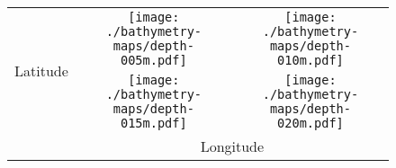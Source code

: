 \documentclass[border=20pt,varwidth=30cm]{standalone}
\begin{document}
\begin{figure}
    \centering
    \begin{tabular}{@{}ccc@{}}
        \multirow{2}{*}[16em]{\begin{rotate}{90}\Huge Latitude\end{rotate}} &
        \texttt{[image: ./bathymetry-maps/depth-005m.pdf]} &
        \texttt{[image: ./bathymetry-maps/depth-010m.pdf]} \\
        &
        \texttt{[image: ./bathymetry-maps/depth-015m.pdf]} &
        \texttt{[image: ./bathymetry-maps/depth-020m.pdf]} \\
        & \multicolumn{2}{c}{\Huge Longitude}
    \end{tabular}
\end{figure}
\end{document}
